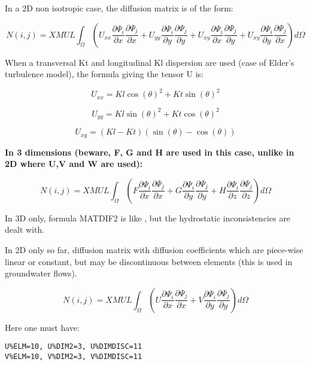 In a 2D non isotropic case, the diffusion matrix is of the form:

\[
  N(i,j)=XMUL \int _{\Omega }
(U_{xx} \frac{\partial \Psi _{i} }{\partial x}
        \frac{\partial \Psi _{j} }{\partial x}
 +U_{yy} \frac{\partial \Psi _{i} }{\partial y}
         \frac{\partial \Psi _{j} }{\partial y}
 +U_{xy} \frac{\partial \Psi _{i} }{\partial x}
         \frac{\partial \Psi _{j} }{\partial y}
 +U_{xy} \frac{\partial \Psi _{i} }{\partial y}
         \frac{\partial \Psi _{j} }{\partial x} )d\Omega
\]

When a transversal Kt and longitudinal Kl dispersion are used (case of Elder's
turbulence model), the formula giving the tensor U is:

\[U_{xx} =Kl \cos (\theta )^{2} +Kt \sin (\theta )^{2} \]

\[U_{yy} =Kl \sin (\theta )^{2} +Kt \cos (\theta )^{2} \]

\[U_{xy} =(Kl-Kt) (\sin (\theta )- \cos (\theta ))\]

\textbf{In 3 dimensions (beware, F, G and H are used in this case, unlike in 2D
where U,V and W are used):}

\[
  N(i,j)=XMUL
\int _{\Omega }
(F\frac{\partial \Psi _{i} }{\partial x}
  \frac{\partial \Psi _{j} }{\partial x}
+G\frac{\partial \Psi _{i} }{\partial y}
  \frac{\partial \Psi _{j} }{\partial y}
+H\frac{\partial \Psi _{i} }{\partial z}
  \frac{\partial \Psi _{j} }{\partial z} )d\Omega
\]


In 3D only, formula MATDIF2 is like , but the
hydrostatic inconsistencies are dealt with.


In 2D only so far, diffusion matrix with diffusion coefficients which are
piece-wise linear or constant, but may be discontinuous between elements (this
is used in groundwater flows).

\[
N(i,j)=XMUL\int _{\Omega }
(U\frac{\partial \Psi _{i} }{\partial x}
  \frac{\partial \Psi _{j} }{\partial x}
+V\frac{\partial \Psi _{i} }{\partial y}
  \frac{\partial \Psi _{j} }{\partial y} )d\Omega
\]

Here one must have:
\begin{lstlisting}[language=TelFortran]
U%ELM=10, U%DIM2=3, U%DIMDISC=11
V%ELM=10, V%DIM2=3, V%DIMDISC=11
\end{lstlisting}


